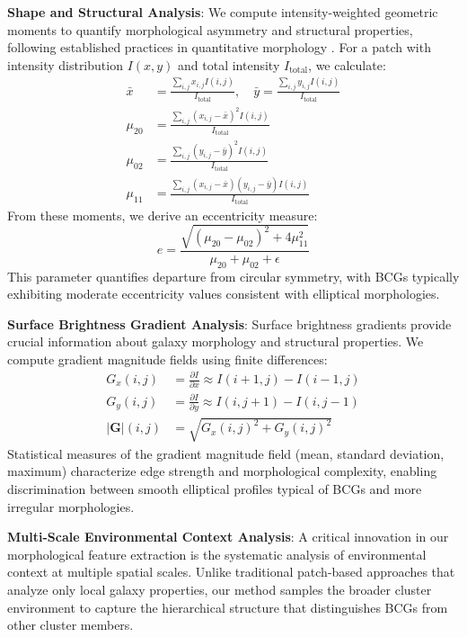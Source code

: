 \documentclass[twocolumn,10pt]{aastex631}
\begin{document}
\textbf{Shape and Structural Analysis}: We compute intensity-weighted geometric moments to quantify morphological asymmetry and structural properties, following established practices in quantitative morphology \citep{Hambleton2011}. For a patch with intensity distribution $I(x,y)$ and total intensity $I_{\text{total}}$, we calculate:
\begin{align}
\bar{x} &= \frac{\sum_{i,j} x_{i,j} I(i,j)}{I_{\text{total}}}, \quad \bar{y} = \frac{\sum_{i,j} y_{i,j} I(i,j)}{I_{\text{total}}} \\
\mu_{20} &= \frac{\sum_{i,j} (x_{i,j} - \bar{x})^2 I(i,j)}{I_{\text{total}}} \\
\mu_{02} &= \frac{\sum_{i,j} (y_{i,j} - \bar{y})^2 I(i,j)}{I_{\text{total}}} \\
\mu_{11} &= \frac{\sum_{i,j} (x_{i,j} - \bar{x})(y_{i,j} - \bar{y}) I(i,j)}{I_{\text{total}}}
\end{align}
From these moments, we derive an eccentricity measure:
\begin{equation}
e = \frac{\sqrt{(\mu_{20} - \mu_{02})^2 + 4\mu_{11}^2}}{\mu_{20} + \mu_{02} + \epsilon}
\end{equation}
This parameter quantifies departure from circular symmetry, with BCGs typically exhibiting moderate eccentricity values consistent with elliptical morphologies.

\textbf{Surface Brightness Gradient Analysis}: Surface brightness gradients provide crucial information about galaxy morphology and structural properties. We compute gradient magnitude fields using finite differences:
\begin{align}
G_x(i,j) &= \frac{\partial I}{\partial x} \approx I(i+1,j) - I(i-1,j) \\
G_y(i,j) &= \frac{\partial I}{\partial y} \approx I(i,j+1) - I(i,j-1) \\
|\mathbf{G}|(i,j) &= \sqrt{G_x(i,j)^2 + G_y(i,j)^2}
\end{align}
Statistical measures of the gradient magnitude field (mean, standard deviation, maximum) characterize edge strength and morphological complexity, enabling discrimination between smooth elliptical profiles typical of BCGs and more irregular morphologies.

\textbf{Multi-Scale Environmental Context Analysis}: A critical innovation in our morphological feature extraction is the systematic analysis of environmental context at multiple spatial scales. Unlike traditional patch-based approaches that analyze only local galaxy properties, our method samples the broader cluster environment to capture the hierarchical structure that distinguishes BCGs from other cluster members.
\end{document}
